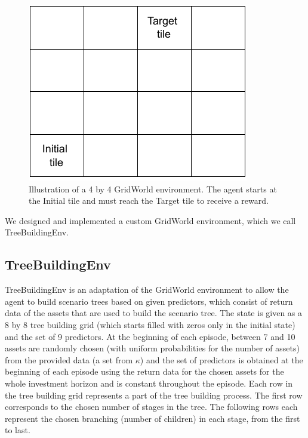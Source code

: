 \begin{figure}[H]
\centering
  \includegraphics[width=\linewidth / 3]{../img/gridworld_env_illustration.pdf}
  \caption{Illustration of a 4 by 4 GridWorld environment. The agent starts at the Initial tile and must reach the Target tile to receive a reward.}
  \label{fig:gridworldenv_illustration}
\end{figure}

We designed and implemented a custom GridWorld environment, which we call TreeBuildingEnv.

\subsection{TreeBuildingEnv}
\label{section:treebuildingenv}
TreeBuildingEnv is an adaptation of the GridWorld environment to allow the agent to build scenario trees based on given predictors, which consist of return data of the assets that are used to build the scenario tree. 
The state is given as a 8 by 8 tree building grid (which starts filled with zeros only in the initial state) and the set of 9 predictors. At the beginning of each episode, between 7 and 10 assets are randomly chosen (with uniform probabilities for the number of assets) from the provided data (a set from $\kappa$) and the set of predictors is obtained at the beginning of each episode using the return data for the chosen assets for the whole investment horizon and is constant throughout the episode. Each row in the tree building grid represents a part of the tree building process. The first row corresponds to the chosen number of stages in the tree. The following rows each represent the chosen branching (number of children) in each stage, from the first to last.

